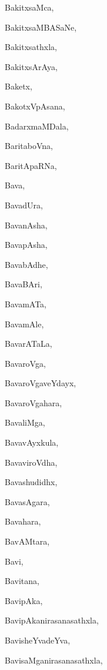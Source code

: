 \begin{multicols}{2}
{BakitxsaMca}, \pageref{BakitxsaMca}

{BakitxsaMBASaNe}, \pageref{BakitxsaMBASaNe}

{Bakitxsathxla}, \pageref{Bakitxsathxla}

{BakitxsArAya}, \pageref{BakitxsArAya}

{Baketx}, \pageref{Baketx}

{BakotxVpAsana}, \pageref{BakotxVpAsana}

{BadarxmaMDala}, \pageref{BadarxmaMDala}

{BaritaboVna}, \pageref{BaritaboVna}

{BaritApaRNa}, \pageref{BaritApaRNa}

{Bava}, \pageref{Bava}

{BavadUra}, \pageref{BavadUra}

{BavanAsha}, \pageref{BavanAsha}

{BavapAsha}, \pageref{BavapAsha}

{BavabAdhe}, \pageref{BavabAdhe}

{BavaBAri}, \pageref{BavaBAri}

{BavamATa}, \pageref{BavamATa}

{BavamAle}, \pageref{BavamAle}

{BavarATaLa}, \pageref{BavarATaLa}

{BavaroVga}, \pageref{BavaroVga}

{BavaroVgaveYdayx}, \pageref{BavaroVgaveYdayx}

{BavaroVgahara}, \pageref{BavaroVgahara}

{BavaliMga}, \pageref{BavaliMga}

{BavavAyxkula}, \pageref{BavavAyxkula}

{BavaviroVdha}, \pageref{BavaviroVdha}

{Bavashudidhx}, \pageref{Bavashudidhx}

{BavasAgara}, \pageref{BavasAgara}

{Bavahara}, \pageref{Bavahara}

{BavAMtara}, \pageref{BavAMtara}

{Bavi}, \pageref{Bavi}

{Bavitana}, \pageref{Bavitana}

{BavipAka}, \pageref{BavipAka}

{BavipAkanirasanasathxla}, \pageref{BavipAkanirasanasathxla}

{BavisheYvadeYva}, \pageref{BavisheYvadeYva}

{BavisaMganirasanasathxla}, \pageref{BavisaMganirasanasathxla}


\end{multicols}
